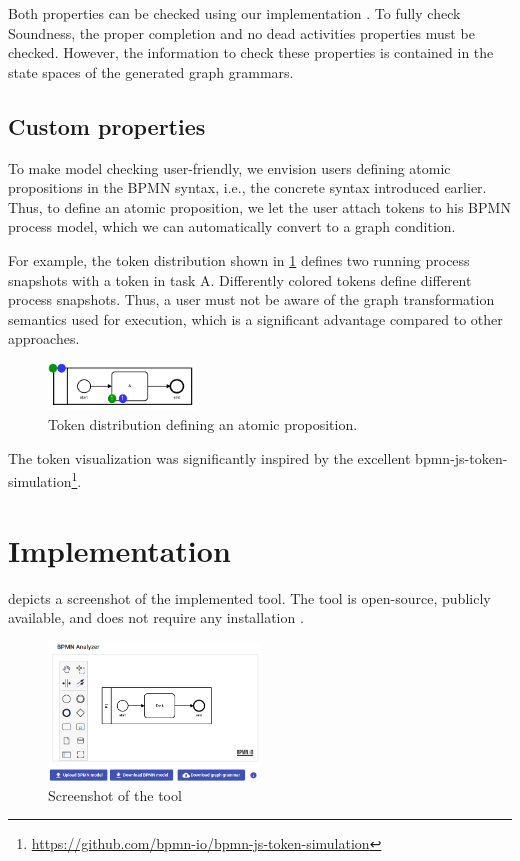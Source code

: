 \documentclass[submission, copyright, creativecommons]{eptcs}
\begin{document}
Both properties can be checked using our implementation \cite{timkrauterArtifactsTERMGRAPH2022}.
To fully check Soundness, the proper completion and no dead activities properties must be checked.
However, the information to check these properties is contained in the state spaces of the generated graph grammars.

\subsection{Custom properties} \label{subsec:customProperties}
To make model checking user-friendly, we envision users defining atomic propositions in the BPMN syntax, i.e., the concrete syntax introduced earlier.
Thus, to define an atomic proposition, we let the user attach tokens to his BPMN process model, which we can automatically convert to a graph condition.

For example, the token distribution shown in \cref{fig:atomicProposition} defines two running process snapshots with a token in task A.
Differently colored tokens define different process snapshots.
Thus, a user must not be aware of the graph transformation semantics used for execution, which is a significant advantage compared to other approaches.

\begin{figure}[h]
    \centering
    \includegraphics[width=0.35\textwidth]{images/bpmn_semantics-atomic-proposition.pdf}
    \caption{Token distribution defining an atomic proposition.}
    \label{fig:atomicProposition}
\end{figure}

The token visualization was significantly inspired by the excellent bpmn-js-token-simulation\footnote{\url{https://github.com/bpmn-io/bpmn-js-token-simulation}}.
\section{Implementation} \label{sec:impl}
 depicts a screenshot of the implemented tool.
The tool is open-source, publicly available, and does not require any installation \cite{timkrauterArtifactsTERMGRAPH2022}.

\begin{figure}[h]
    \centering
    \includegraphics[width=0.5\textwidth]{images/impl.png}
    \caption{Screenshot of the tool}
    \label{fig:implScreenshot}
\end{figure}
\end{document}
